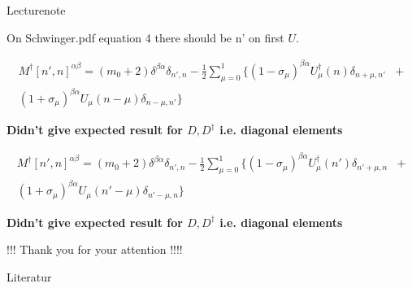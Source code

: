 \documentclass[10pt]{beamer}
\begin{document}
 \begin{frame} {Lecturenote}
     \begin{center}
        On Schwinger.pdf equation 4 there should be n' on first $U$.
    \end{center}
    \begin{align}
        M^{\dagger}[n',n]^{\alpha\beta} = (m_0+2)\delta^{\beta\alpha}\delta_{n',n} -\frac{1}{2}\sum\limits_{\mu=0}^{1}\{(1-\sigma_\mu)^{\beta\alpha}U^{\dagger}_{\mu}(n)\delta_{n+\mu,n'} &+  \nonumber \\
        (1+\sigma_\mu)^{\beta\alpha}U_{\mu}(n-\mu)\delta_{n-\mu,n'}  \}\end{align}
     \begin{center}
            \textbf{Didn't give expected result for $D,D^{\dagger}$ i.e. diagonal elements}\end{center}
    \begin{align}
        M^{\dagger}[n',n]^{\alpha\beta} = (m_0+2)\delta^{\beta\alpha}\delta_{n',n} -\frac{1}{2}\sum\limits_{\mu=0}^{1}\{(1-\sigma_\mu)^{\beta\alpha}U^{\dagger}_{\mu}(n')\delta_{n'+\mu,n} &+  \nonumber \\
        (1+\sigma_\mu)^{\beta\alpha}U_{\mu}(n'-\mu)\delta_{n'-\mu,n}  \} 
    \end{align}\begin{center}
        \textbf{Didn't give expected result for $D,D^{\dagger}$ i.e. diagonal elements}\end{center}
    
    
 \end{frame}

\begin{frame}
    \begin{center}
        !!! Thank you for your attention !!!!
    \end{center}
        
\end{frame}

\begin{frame}{Literatur}
    \printbibliography
\end{frame}
\end{document}
